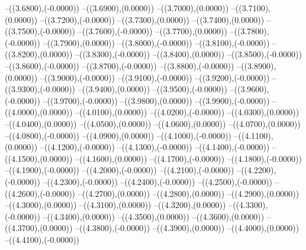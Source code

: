 {	--({\sx*(3.6800)},{\sy*(-0.0000)})
	--({\sx*(3.6900)},{\sy*(0.0000)})
	--({\sx*(3.7000)},{\sy*(0.0000)})
	--({\sx*(3.7100)},{\sy*(0.0000)})
	--({\sx*(3.7200)},{\sy*(-0.0000)})
	--({\sx*(3.7300)},{\sy*(0.0000)})
	--({\sx*(3.7400)},{\sy*(0.0000)})
	--({\sx*(3.7500)},{\sy*(-0.0000)})
	--({\sx*(3.7600)},{\sy*(-0.0000)})
	--({\sx*(3.7700)},{\sy*(0.0000)})
	--({\sx*(3.7800)},{\sy*(-0.0000)})
	--({\sx*(3.7900)},{\sy*(0.0000)})
	--({\sx*(3.8000)},{\sy*(-0.0000)})
	--({\sx*(3.8100)},{\sy*(-0.0000)})
	--({\sx*(3.8200)},{\sy*(0.0000)})
	--({\sx*(3.8300)},{\sy*(-0.0000)})
	--({\sx*(3.8400)},{\sy*(0.0000)})
	--({\sx*(3.8500)},{\sy*(-0.0000)})
	--({\sx*(3.8600)},{\sy*(-0.0000)})
	--({\sx*(3.8700)},{\sy*(-0.0000)})
	--({\sx*(3.8800)},{\sy*(-0.0000)})
	--({\sx*(3.8900)},{\sy*(0.0000)})
	--({\sx*(3.9000)},{\sy*(-0.0000)})
	--({\sx*(3.9100)},{\sy*(-0.0000)})
	--({\sx*(3.9200)},{\sy*(-0.0000)})
	--({\sx*(3.9300)},{\sy*(-0.0000)})
	--({\sx*(3.9400)},{\sy*(0.0000)})
	--({\sx*(3.9500)},{\sy*(-0.0000)})
	--({\sx*(3.9600)},{\sy*(-0.0000)})
	--({\sx*(3.9700)},{\sy*(-0.0000)})
	--({\sx*(3.9800)},{\sy*(0.0000)})
	--({\sx*(3.9900)},{\sy*(-0.0000)})
	--({\sx*(4.0000)},{\sy*(0.0000)})
	--({\sx*(4.0100)},{\sy*(0.0000)})
	--({\sx*(4.0200)},{\sy*(-0.0000)})
	--({\sx*(4.0300)},{\sy*(0.0000)})
	--({\sx*(4.0400)},{\sy*(0.0000)})
	--({\sx*(4.0500)},{\sy*(0.0000)})
	--({\sx*(4.0600)},{\sy*(0.0000)})
	--({\sx*(4.0700)},{\sy*(0.0000)})
	--({\sx*(4.0800)},{\sy*(-0.0000)})
	--({\sx*(4.0900)},{\sy*(0.0000)})
	--({\sx*(4.1000)},{\sy*(-0.0000)})
	--({\sx*(4.1100)},{\sy*(0.0000)})
	--({\sx*(4.1200)},{\sy*(-0.0000)})
	--({\sx*(4.1300)},{\sy*(-0.0000)})
	--({\sx*(4.1400)},{\sy*(-0.0000)})
	--({\sx*(4.1500)},{\sy*(0.0000)})
	--({\sx*(4.1600)},{\sy*(0.0000)})
	--({\sx*(4.1700)},{\sy*(-0.0000)})
	--({\sx*(4.1800)},{\sy*(-0.0000)})
	--({\sx*(4.1900)},{\sy*(-0.0000)})
	--({\sx*(4.2000)},{\sy*(-0.0000)})
	--({\sx*(4.2100)},{\sy*(-0.0000)})
	--({\sx*(4.2200)},{\sy*(-0.0000)})
	--({\sx*(4.2300)},{\sy*(-0.0000)})
	--({\sx*(4.2400)},{\sy*(-0.0000)})
	--({\sx*(4.2500)},{\sy*(-0.0000)})
	--({\sx*(4.2600)},{\sy*(-0.0000)})
	--({\sx*(4.2700)},{\sy*(0.0000)})
	--({\sx*(4.2800)},{\sy*(0.0000)})
	--({\sx*(4.2900)},{\sy*(0.0000)})
	--({\sx*(4.3000)},{\sy*(0.0000)})
	--({\sx*(4.3100)},{\sy*(0.0000)})
	--({\sx*(4.3200)},{\sy*(0.0000)})
	--({\sx*(4.3300)},{\sy*(-0.0000)})
	--({\sx*(4.3400)},{\sy*(0.0000)})
	--({\sx*(4.3500)},{\sy*(0.0000)})
	--({\sx*(4.3600)},{\sy*(0.0000)})
	--({\sx*(4.3700)},{\sy*(0.0000)})
	--({\sx*(4.3800)},{\sy*(-0.0000)})
	--({\sx*(4.3900)},{\sy*(0.0000)})
	--({\sx*(4.4000)},{\sy*(0.0000)})
	--({\sx*(4.4100)},{\sy*(-0.0000)})
}
